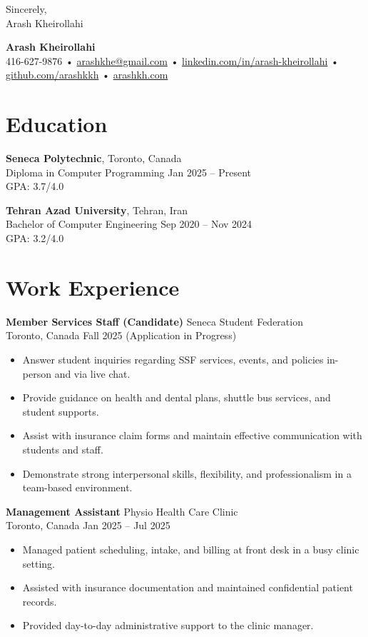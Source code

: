 \documentclass[letterpaper,11pt]{article}
\begin{document}
Sincerely,\\
Arash Kheirollahi

\newpage


{\LARGE \textbf{Arash Kheirollahi}}\\[0.5em]
416-627-9876 • \href{mailto:arashkhe@gmail.com}{arashkhe@gmail.com} •
\href{https://www.linkedin.com/in/arash-kheirollahi/}{linkedin.com/in/arash-kheirollahi} •
\href{https://github.com/arashkkh}{github.com/arashkkh} •
\href{https://www.arashkh.com}{arashkh.com}

\section*{Education}
\textbf{Seneca Polytechnic}, Toronto, Canada \\
Diploma in Computer Programming \hfill Jan 2025 – Present \\
GPA: 3.7/4.0

\textbf{Tehran Azad University}, Tehran, Iran \\
Bachelor of Computer Engineering \hfill Sep 2020 – Nov 2024 \\
GPA: 3.2/4.0

\section*{Work Experience}
\textbf{Member Services Staff (Candidate)} \hfill Seneca Student Federation \\
Toronto, Canada \hfill Fall 2025 (Application in Progress)
\begin{itemize}[leftmargin=*]
  \item Answer student inquiries regarding SSF services, events, and policies in-person and via live chat.
  \item Provide guidance on health and dental plans, shuttle bus services, and student supports.
  \item Assist with insurance claim forms and maintain effective communication with students and staff.
  \item Demonstrate strong interpersonal skills, flexibility, and professionalism in a team-based environment.
\end{itemize}

\textbf{Management Assistant} \hfill Physio Health Care Clinic \\
Toronto, Canada \hfill Jan 2025 – Jul 2025
\begin{itemize}[leftmargin=*]
  \item Managed patient scheduling, intake, and billing at front desk in a busy clinic setting.
  \item Assisted with insurance documentation and maintained confidential patient records.
  \item Provided day-to-day administrative support to the clinic manager.
\end{itemize}
\end{document}
